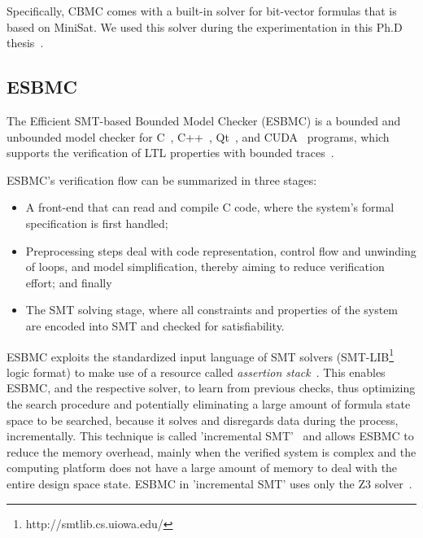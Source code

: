 Specifically, CBMC comes with a built-in solver for bit-vector formulas that is based on MiniSat. We used this solver during the experimentation in this Ph.D thesis~\cite{Kroening}.

\subsection{ESBMC}

The Efficient SMT-based Bounded Model Checker (ESBMC) is a bounded and unbounded model checker for C~\cite{esbmc2018}, C++~\cite{RamalhoFSMC013}, Qt~\cite{MonteiroGCF17}, and CUDA~\cite{PereiraASMMFC17} programs, which supports the verification of LTL properties with bounded traces~\cite{DBLP:journals/sosym/MorseCN015}. 

ESBMC's verification flow can be summarized in three stages: 

\begin{itemize}
\item A front-end that can read and compile C code, where the system's formal specification is first handled; 
\item Preprocessing steps deal with code representation, control flow and unwinding of loops, and model simplification, thereby aiming to reduce verification effort; and finally 
\item The SMT solving stage, where all constraints and properties of the system are encoded into SMT and checked for satisfiability.
\end{itemize}
 
ESBMC exploits the standardized input language of SMT solvers (SMT-LIB\footnote{http://smtlib.cs.uiowa.edu/} logic format) to make use of a resource called \textit{assertion stack}~\cite{Morse2015}. This enables ESBMC, and the respective solver, to learn from previous checks, thus optimizing the search procedure and potentially eliminating a large amount of formula state space to be searched, because it solves and disregards data during the process, incrementally. This technique is called 'incremental SMT'~\cite{DBLP:journals/fac/SchrammelKBMTB17} and allows ESBMC to reduce the memory overhead, mainly when the verified system is complex and the computing platform does not have a large amount of memory to deal with the entire design space state. ESBMC in 'incremental SMT' uses only the Z3 solver~\cite{DeMoura}.

